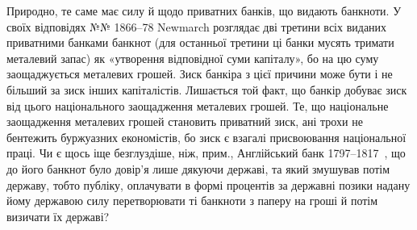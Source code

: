 Природно, те саме має силу й щодо приватних банків, що видають банкноти.
У своїх відповідях №№ 1866--78 Newmarch розглядає дві третини всіх виданих
приватними банками банкнот (для останньої третини ці банки мусять тримати
металевий запас) як «утворення відповідної суми капіталу», бо на цю суму заощаджується
металевих грошей. Зиск банкіра з цієї причини може бути і не більший
за зиск інших капіталістів. Лишається той факт, що банкір добуває зиск від цього
національного заощадження металевих грошей. Те, що національне заощадження
металевих грошей становить приватний зиск, ані трохи не бентежить буржуазних
економістів, бо зиск є взагалі присвоювання національної праці. Чи є щось
іще безглуздіше, ніж, прим., Англійський банк 1797--1817~, що до його
банкнот було довір’я лише дякуючи державі, та який змушував потім державу,
тобто публіку, оплачувати в формі процентів за державні позики надану йому
державою силу перетворювати ті банкноти з паперу на гроші й потім визичати
їх державі?
